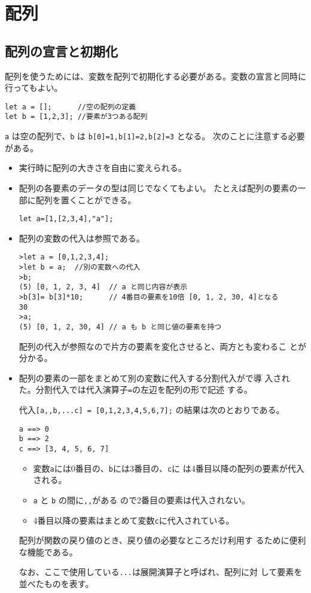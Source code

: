 \section{配列}
\subsection{配列の宣言と初期化}
配列を使うためには、変数を配列で初期化する必要がある。変数の宣言と同時に
行ってもよい。
\begin{Verbatim}
let a = [];      //空の配列の定義
let b = [1,2,3]; //要素が3つある配列
\end{Verbatim}
\Verb+a+ は空の配列で、\Verb+b+ は
\Verb+b[0]=1,b[1]=2,b[2]=3+ となる。
次のことに注意する必要がある。
\begin{itemize}
 \item 実行時に配列の大きさを自由に変えられる。
 \item 配列の各要素のデータの型は同じでなくてもよい。
 たとえば配列の要素の一部に配列を置くことができる。
\begin{Verbatim}
let a=[1,[2,3,4],"a"];
\end{Verbatim}
 \item 配列の変数の代入は参照である。
\begin{Verbatim}
>let a = [0,1,2,3,4];
>let b = a;  //別の変数への代入
>b;
(5) [0, 1, 2, 3, 4]  // a と同じ内容が表示
>b[3]= b[3]*10;      // 4番目の要素を10倍 [0, 1, 2, 30, 4]となる
30
>a;
(5) [0, 1, 2, 30, 4] // a も b と同じ値の要素を持つ
\end{Verbatim}
       配列の代入が参照なので片方の要素を変化させると、両方とも変わるこ
       とが分かる。
 \item 配列の要素の一部をまとめて別の変数に代入する分割代入が\ES で導
       入された。分割代入では代入演算子\texttt{=}の左辺を配列の形で記述
       する。

       代入\Verb+[a,,b,...c] = [0,1,2,3,4,5,6,7];+
の結果は次のとおりである。
\begin{Verbatim}
a ==> 0
b ==> 2
c ==> [3, 4, 5, 6, 7]
\end{Verbatim}
       \begin{itemize}
        \item  変数\Verb+a+には0番目の、\Verb+b+には3番目の、\Verb+c+に
               は4番目以降の配列の要素が代入される。
        \item \Verb+a+ と \Verb+b+ の間に\Verb+,,+がある
       ので2番目の要素は代入されない。
        \item 4番目以降の要素はまとめて変数\Verb+c+に代入されている。

       \end{itemize}

 配列が関数の戻り値のとき、戻り値の必要なところだけ利用す
       るために便利な機能である。

       なお、ここで使用している\Verb+...+は展開演算子と呼ばれ、配列に対
       して要素を並べたものを表す。
\end{itemize}

